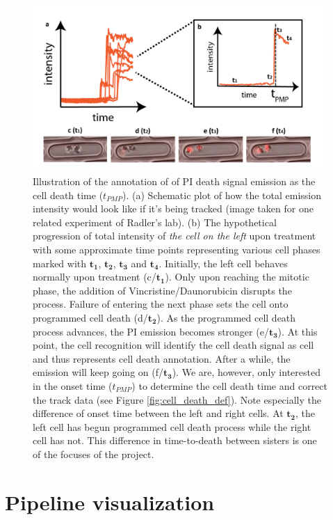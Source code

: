 \documentclass[pdftex,12pt,a4paper]{report}
\begin{document}
\begin{figure}[H]
\centering
\includegraphics[width=\textwidth]{images/cell_death_detection}
\caption[Illustration of annotation of PI death signal]{Illustration of the annotation of of PI death signal emission as the cell death time ($t_{PMP}$). (a) Schematic plot of how the total emission intensity would look like if it's being tracked (image taken for one related experiment of Radler's lab). (b) The hypothetical progression of total intensity of \textit{the cell on the left} upon treatment with some approximate time points representing various cell phases marked with $\mathbf{t_1}$, $\mathbf{t_2}$, $\mathbf{t_3}$ and $\mathbf{t_4}$. Initially, the left cell behaves normally upon treatment (c/$\mathbf{t_1}$). Only upon reaching the mitotic phase, the addition of Vincristine/Daunorubicin disrupts the process. Failure of entering the next phase sets the cell onto programmed cell death (d/$\mathbf{t_2}$). As the programmed cell death process advances, the PI emission becomes stronger (e/$\mathbf{t_3}$). At this point, the cell recognition will identify the cell death signal as cell and thus represents cell death annotation. After a while, the emission will keep going on (f/$\mathbf{t_3}$). We are, however, only interested in the onset time ($t_{PMP}$) to determine the cell death time and correct the track data (see Figure \ref{fig:cell_death_def}). Note especially the difference of onset time between the left and right cells. At $\mathbf{t_2}$, the left cell has begun programmed cell death process while the right cell has not. This difference in time-to-death between sisters is one of the focuses of the project.
}
\label{fig:cell_death_determination_example}
\end{figure}

\section{Pipeline visualization}
\end{document}
